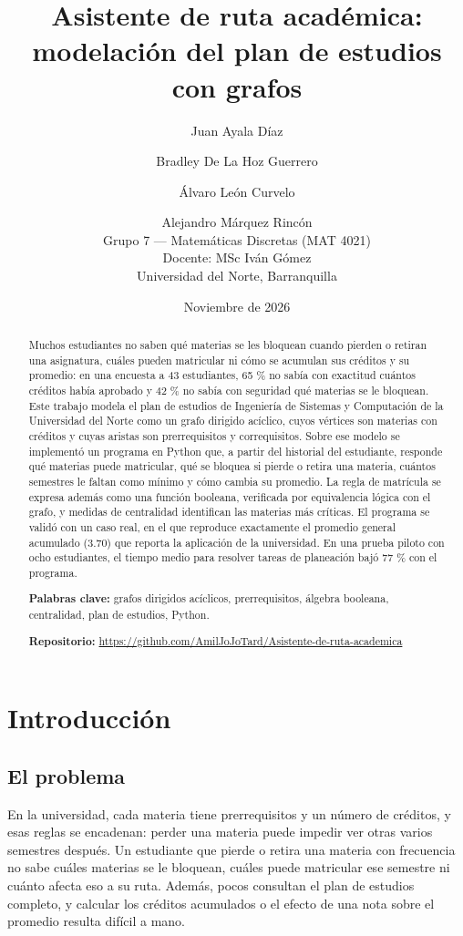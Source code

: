 \documentclass[11pt,a4paper]{article}
\title{Asistente de ruta académica:\\ modelación del plan de estudios con grafos}
\author{Juan Ayala Díaz \and Bradley De La Hoz Guerrero \and Álvaro León Curvelo \and Alejandro Márquez Rincón\\[0.6em]
Grupo 7 --- Matemáticas Discretas (MAT 4021)\\ Docente: MSc Iván Gómez\\ Universidad del Norte, Barranquilla}
\date{Noviembre de 2026}
\begin{document}
\maketitle

\begin{abstract}
Muchos estudiantes no saben qué materias se les bloquean cuando pierden o retiran una asignatura, cuáles pueden matricular ni cómo se acumulan sus créditos y su promedio: en una encuesta a 43 estudiantes, 65 \% no sabía con exactitud cuántos créditos había aprobado y 42 \% no sabía con seguridad qué materias se le bloquean. Este trabajo modela el plan de estudios de Ingeniería de Sistemas y Computación de la Universidad del Norte como un grafo dirigido acíclico, cuyos vértices son materias con créditos y cuyas aristas son prerrequisitos y correquisitos. Sobre ese modelo se implementó un programa en Python que, a partir del historial del estudiante, responde qué materias puede matricular, qué se bloquea si pierde o retira una materia, cuántos semestres le faltan como mínimo y cómo cambia su promedio. La regla de matrícula se expresa además como una función booleana, verificada por equivalencia lógica con el grafo, y medidas de centralidad identifican las materias más críticas. El programa se validó con un caso real, en el que reproduce exactamente el promedio general acumulado (3.70) que reporta la aplicación de la universidad. En una prueba piloto con ocho estudiantes, el tiempo medio para resolver tareas de planeación bajó 77 \% con el programa.

\medskip
\noindent\textbf{Palabras clave:} grafos dirigidos acíclicos, prerrequisitos, álgebra booleana, centralidad, plan de estudios, Python.

\medskip\noindent\textbf{Repositorio:} \url{https://github.com/AmilJoJoTard/Asistente-de-ruta-academica}
\end{abstract}

\section{Introducción}

\subsection{El problema}
En la universidad, cada materia tiene prerrequisitos y un número de créditos, y esas reglas se encadenan: perder una materia puede impedir ver otras varios semestres después. Un estudiante que pierde o retira una materia con frecuencia no sabe cuáles materias se le bloquean, cuáles puede matricular ese semestre ni cuánto afecta eso a su ruta. Además, pocos consultan el plan de estudios completo, y calcular los créditos acumulados o el efecto de una nota sobre el promedio resulta difícil a mano.
\end{document}
